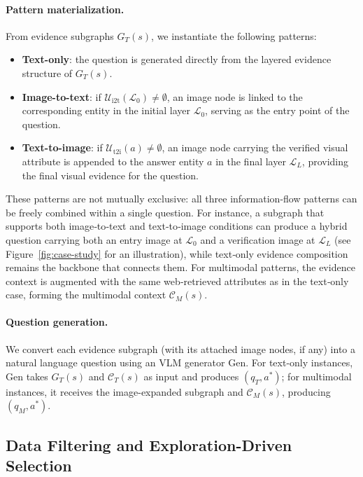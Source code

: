 \documentclass[11pt]{article}
\begin{document}
\paragraph{Pattern materialization.}
From evidence subgraphs ${G_T(s)}$, we instantiate the following patterns:
\begin{itemize}[leftmargin=*]
    \item \textbf{Text-only}: the question is generated directly from the layered evidence structure of $G_T(s)$.
    \item \textbf{Image-to-text}: if $\mathcal{U}_{\mathrm{i2t}}(\mathcal{L}_0) \neq \emptyset$, an image node is linked to the corresponding entity in the initial layer $\mathcal{L}_0$, serving as the entry point of the question.
    \item \textbf{Text-to-image}: if $\mathcal{U}_{\mathrm{t2i}}(a) \neq \emptyset$, an image node carrying the verified visual attribute is appended to the answer entity $a$ in the final layer $\mathcal{L}_L$, providing the final visual evidence for the question.
\end{itemize}
These patterns are not mutually exclusive: all three information-flow patterns can be freely combined within a single question. For instance, a subgraph that supports both image‑to‑text and text‑to‑image conditions can produce a hybrid question carrying both an entry image at $\mathcal{L}_0$ and a verification image at $\mathcal{L}_L$ (see Figure~\ref{fig:case-study} for an illustration), while text‑only evidence composition remains the backbone that connects them. For multimodal patterns, the evidence context is augmented with the same web‑retrieved attributes as in the text‑only case, forming the multimodal context $\mathcal{C}_M(s)$.

\paragraph{Question generation.}
We convert each evidence subgraph (with its attached image nodes, if any) into a natural language question using an VLM generator $\mathrm{Gen}$. For text-only instances, $\mathrm{Gen}$ takes $G_T(s)$ and $\mathcal{C}_T(s)$ as input and produces $(q_T, a^*)$; for multimodal instances, it receives the image-expanded subgraph and $\mathcal{C}_M(s)$, producing $(q_M, a^*)$.

\subsection{Data Filtering and Exploration-Driven Selection}
\label{sec:data-filtering}
\end{document}

